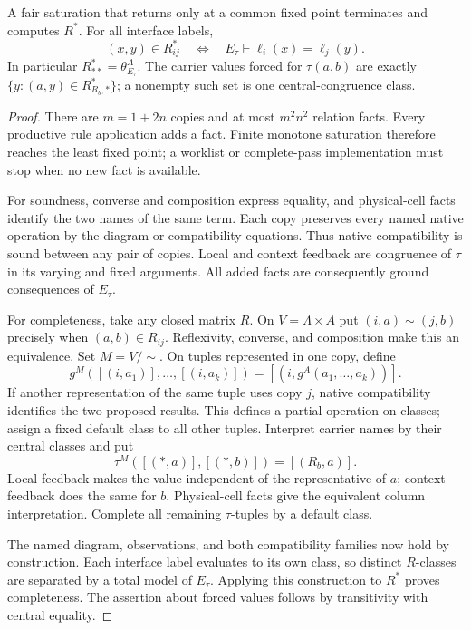 \begin{theorem}\label{thm:matrix}
A fair saturation that returns only at a common fixed point terminates and computes $R^*$. For all interface labels,
\[
\boxed{(x,y)\in R^*_{ij}\quad\Longleftrightarrow\quad
E_\tau\vdash\ell_i(x)=\ell_j(y).}
\]
In particular $R^*_{**}=\theta_{E_\tau}^A$. The carrier values forced for $\tau(a,b)$ are exactly $\{y:(a,y)\in R^*_{R_b,*}\}$; a nonempty such set is one central-congruence class.
\end{theorem}
\begin{proof}
There are $m=1+2n$ copies and at most $m^2n^2$ relation facts. Every productive rule application adds a fact. Finite monotone saturation therefore reaches the least fixed point; a worklist or complete-pass implementation must stop when no new fact is available.

For soundness, converse and composition express equality, and physical-cell facts identify the two names of the same term. Each copy preserves every named native operation by the diagram or compatibility equations. Thus native compatibility is sound between any pair of copies. Local and context feedback are congruence of $\tau$ in its varying and fixed arguments. All added facts are consequently ground consequences of $E_\tau$.

For completeness, take any closed matrix $R$. On $V=\Lambda\times A$ put $(i,a)\sim(j,b)$ precisely when $(a,b)\in R_{ij}$. Reflexivity, converse, and composition make this an equivalence. Set $M=V/{\sim}$. On tuples represented in one copy, define
\[
g^M([(i,a_1)],\ldots,[(i,a_k)])=[(i,g^A(a_1,\ldots,a_k))].
\]
If another representation of the same tuple uses copy $j$, native compatibility identifies the two proposed results. This defines a partial operation on classes; assign a fixed default class to all other tuples. Interpret carrier names by their central classes and put
\[
\tau^M([(*,a)],[(*,b)])=[(R_b,a)].
\]
Local feedback makes the value independent of the representative of $a$; context feedback does the same for $b$. Physical-cell facts give the equivalent column interpretation. Complete all remaining $\tau$-tuples by a default class.

The named diagram, observations, and both compatibility families now hold by construction. Each interface label evaluates to its own class, so distinct $R$-classes are separated by a total model of $E_\tau$. Applying this construction to $R^*$ proves completeness. The assertion about forced values follows by transitivity with central equality.
\end{proof}

